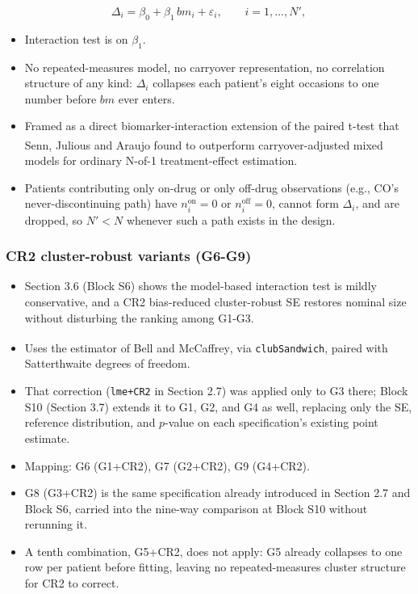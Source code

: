 \documentclass[
  11pt,
]{article}
\providecommand{\tightlist}{%
  \setlength{\itemsep}{0pt}\setlength{\parskip}{0pt}}
\begin{document}
\[
\Delta_i = \beta_0 + \beta_1\, bm_i + \varepsilon_i, \qquad
i = 1, \dots, N',
\]

\begin{itemize}
\tightlist
\item
  Interaction test is on \(\beta_1\).
\item
  No repeated-measures model, no carryover representation, no
  correlation structure of any kind: \(\Delta_i\) collapses each
  patient's eight occasions to one number before \(bm\) ever enters.
\item
  Framed as a direct biomarker-interaction extension of the paired
  t-test that Senn, Julious and Araujo\textsuperscript{} found to
  outperform carryover-adjusted mixed models for ordinary N-of-1
  treatment-effect estimation.
\item
  Patients contributing only on-drug or only off-drug observations
  (e.g., CO's never-discontinuing path) have \(n_i^{\text{on}} = 0\) or
  \(n_i^{\text{off}} = 0\), cannot form \(\Delta_i\), and are dropped, so
  \(N' < N\) whenever such a path exists in the design.
\end{itemize}

\subsubsection{CR2 cluster-robust variants (G6-G9)}\label{cr2-cluster-robust-variants-g6-g9}

\begin{itemize}
\tightlist
\item
  Section 3.6 (Block S6) shows the model-based interaction test is
  mildly conservative, and a CR2 bias-reduced cluster-robust SE
  restores nominal size without disturbing the ranking among G1-G3.
\item
  Uses the estimator of Bell and McCaffrey\textsuperscript{}, via
  \texttt{clubSandwich}, paired with Satterthwaite degrees of freedom.
\item
  That correction (\texttt{lme+CR2} in Section 2.7) was applied only to G3
  there; Block S10 (Section 3.7) extends it to G1, G2, and G4 as
  well, replacing only the SE, reference distribution, and \(p\)-value
  on each specification's existing point estimate.
\item
  Mapping: G6 (G1+CR2), G7 (G2+CR2), G9 (G4+CR2).
\item
  G8 (G3+CR2) is the same specification already introduced in
  Section 2.7 and Block S6, carried into the nine-way comparison at
  Block S10 without rerunning it.
\item
  A tenth combination, G5+CR2, does not apply: G5 already collapses
  to one row per patient before fitting, leaving no repeated-measures
  cluster structure for CR2 to correct.
\end{itemize}
\end{document}
